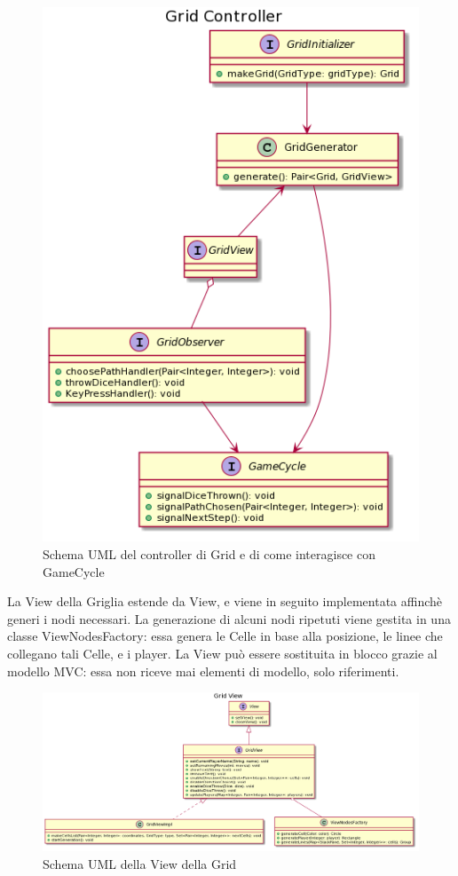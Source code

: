 \documentclass[a4paper,12pt]{report}
\begin{document}
	\begin{figure}[h]
	\centering{}
	\includegraphics[width=\textwidth]{images/miriana/grid_controller.png}
	\caption{Schema UML del controller di Grid e di come interagisce con GameCycle}
	\label{img:gridcontroller}
	\end{figure}

	La View della Griglia estende da View, e viene in seguito implementata affinchè generi i nodi necessari.
	La generazione di alcuni nodi ripetuti viene gestita in una classe ViewNodesFactory: essa genera le Celle in base alla posizione, le linee che collegano tali Celle, e i player.
	La View può essere sostituita in blocco grazie al modello MVC: essa non riceve mai elementi di modello, solo riferimenti.

	\begin{figure}[h]
		\centering{}
		\includegraphics[width=\textwidth]{images/miriana/grid_view.png}
		\caption{Schema UML della View della Grid}
		\label{img:gridview}
	\end{figure}
\end{document}
